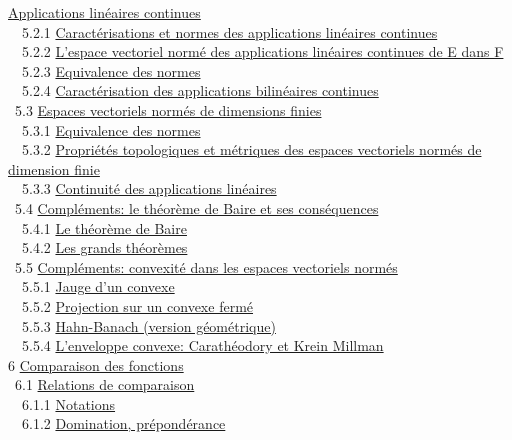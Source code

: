 \documentclass[]{article}
\begin{document}
\href{coursse28.html\#x36-1720005.2}{Applications linéaires continues}
\\ ~~5.2.1 \href{coursse28.html\#x36-1730005.2.1}{Caractérisations et
normes des applications linéaires continues} \\ ~~5.2.2
\href{coursse28.html\#x36-1740005.2.2}{L'espace vectoriel normé des
applications linéaires continues de E dans F} \\ ~~5.2.3
\href{coursse28.html\#x36-1750005.2.3}{Equivalence des normes} \\
~~5.2.4 \href{coursse28.html\#x36-1760005.2.4}{Caractérisation des
applications bilinéaires continues} \\ ~5.3
\href{coursse29.html\#x37-1770005.3}{Espaces vectoriels normés de
dimensions finies} \\ ~~5.3.1
\href{coursse29.html\#x37-1780005.3.1}{Equivalence des normes} \\
~~5.3.2 \href{coursse29.html\#x37-1790005.3.2}{Propriétés topologiques
et métriques des espaces vectoriels normés de dimension finie} \\
~~5.3.3 \href{coursse29.html\#x37-1800005.3.3}{Continuité des
applications linéaires} \\ ~5.4
\href{coursse30.html\#x38-1810005.4}{Compléments: le théorème de Baire
et ses conséquences} \\ ~~5.4.1
\href{coursse30.html\#x38-1820005.4.1}{Le théorème de Baire} \\ ~~5.4.2
\href{coursse30.html\#x38-1830005.4.2}{Les grands théorèmes} \\ ~5.5
\href{coursse31.html\#x39-1840005.5}{Compléments: convexité dans les
espaces vectoriels normés} \\ ~~5.5.1
\href{coursse31.html\#x39-1850005.5.1}{Jauge d'un convexe} \\ ~~5.5.2
\href{coursse31.html\#x39-1860005.5.2}{Projection sur un convexe fermé}
\\ ~~5.5.3 \href{coursse31.html\#x39-1870005.5.3}{Hahn-Banach (version
géométrique)} \\ ~~5.5.4
\href{coursse31.html\#x39-1880005.5.4}{L'enveloppe convexe: Carathéodory
et Krein Millman} \\ 6 \href{coursch7.html\#x40-1890006}{Comparaison des
fonctions} \\ ~6.1 \href{coursse32.html\#x41-1900006.1}{Relations de
comparaison} \\ ~~6.1.1
\href{coursse32.html\#x41-1910006.1.1}{Notations} \\ ~~6.1.2
\href{coursse32.html\#x41-1920006.1.2}{Domination, prépondérance} \\
\end{document}
